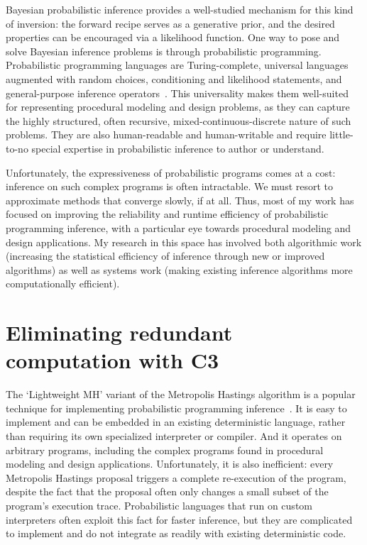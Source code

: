\documentclass[
10pt, %
a4paper, %
oneside, %
headinclude,footinclude, %
BCOR5mm, %
]{scrartcl}
\begin{document}
Bayesian probabilistic inference provides a well-studied mechanism for this kind of inversion: the forward recipe serves as a generative prior, and the desired properties can be encouraged via a likelihood function. One way to pose and solve Bayesian inference problems is through probabilistic programming.
Probabilistic programming languages are Turing-complete, universal languages augmented with random choices, conditioning and likelihood statements, and general-purpose inference operators~\cite{Church}. This universality makes them well-suited for representing procedural modeling and design problems, as they can capture the highly structured, often recursive, mixed-continuous-discrete nature of such problems. They are also human-readable and human-writable and require little-to-no special expertise in probabilistic inference to author or understand.

Unfortunately, the expressiveness of probabilistic programs comes at a cost: inference on such complex programs is often intractable. We must resort to approximate methods that converge slowly, if at all. Thus, most of my work has focused on improving the reliability and runtime efficiency of probabilistic programming inference, with a particular eye towards procedural modeling and design applications. My research in this space has involved both algorithmic work (increasing the statistical efficiency of inference through new or improved algorithms) as well as systems work (making existing inference algorithms more computationally efficient).





\section*{Eliminating redundant computation with C3}

The `Lightweight MH' variant of the Metropolis Hastings algorithm is a popular technique for implementing probabilistic programming inference~\cite{Lightweight}. It is easy to implement and can be embedded in an existing deterministic language, rather than requiring its own specialized interpreter or compiler. And it operates on arbitrary programs, including the complex programs found in procedural modeling and design applications. Unfortunately, it is also inefficient: every Metropolis Hastings proposal triggers a complete re-execution of the program, despite the fact that the proposal often only changes a small subset of the program's execution trace. Probabilistic languages that run on custom interpreters often exploit this fact for faster inference, but they are complicated to implement and do not integrate as readily with existing deterministic code.
\end{document}
